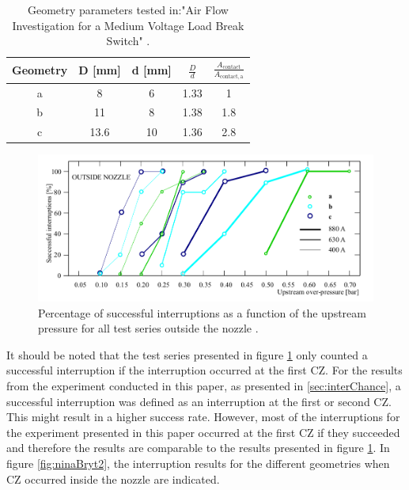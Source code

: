 \documentclass[10pt,a4paper,twoside]{article}
\begin{document}
\begin{table}[H]
\center
\caption{Geometry parameters tested in:"Air Flow Investigation for a Medium Voltage Load Break Switch" \cite{bib:AFIMVLBA}.}
 \begin{tabular}{|c|c|c|c|c|}
\hline 
Geometry & D [mm] & d [mm] & $\frac{D}{d}$ & $\frac{A_\mathrm{{contact}}}{A_\mathrm{{contact,a}}}$ \\ 
\hline 
a & 8 & 6 & 1.33 & 1 \\ 
\hline 
b & 11 & 8 & 1.38 & 1.8 \\ 
\hline 
c & 13.6 & 10 & 1.36 & 2.8 \\ 
\hline 
\end{tabular} 
\label{tab:NinasGeo}
\end{table}

\begin{figure}[H]
  \centering
  \includegraphics[scale=0.4]{Bilder/Discussion/ninaResults.png}
  \caption{Percentage of successful interruptions as a function of the upstream pressure for all test series outside the nozzle \cite{bib:AFIMVLBA}.}
  \label{fig:ninaBryt}
\end{figure}

It should be noted that the test series presented in figure \ref{fig:ninaBryt} only counted a successful interruption if the interruption occurred at the first CZ. For the results from the experiment conducted in this paper, as presented in \ref{sec:interChance}, a successful interruption was defined as an interruption at the first or second CZ. This might result in a higher success rate. However, most of the interruptions for the experiment presented in this paper occurred at the first CZ if they succeeded and therefore the results are comparable to the results presented in figure \ref{fig:ninaBryt}. In figure \ref{fig:ninaBryt2}, the interruption results for the different geometries when CZ occurred inside the nozzle are indicated.
\end{document}

